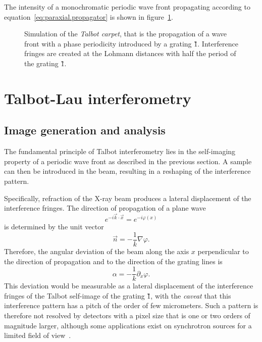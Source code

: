The intensity of a monochromatic periodic wave front propagating according to
equation~\eqref{eq:paraxial.propagator} is shown in
figure~\ref{fig:talbotcarpet}.

\begin{figure}[htb]
    \centering
    
    \caption[Talbot carpet.]{Simulation of the \emph{Talbot carpet},
    that is the propagation of a wave front with a phase periodicity
    introduced by a grating \G1.
    Interference fringes are created at the Lohmann distances with half the
period of the grating \G1.}
    \label{fig:talbotcarpet}
\end{figure}

\section{Talbot-Lau interferometry}
\subsection{Image generation and analysis}\label{sec:gi-image-analysis}
The fundamental principle of Talbot interferometry lies in the self-imaging
property of a periodic wave front as described in the previous section. A
sample can then be introduced in the beam, resulting in a reshaping of the
interference pattern.

Specifically, refraction of the X-ray beam produces a lateral displacement
of the interference fringes. The direction of propagation of a plane wave
\begin{equation}
    e^{-i \vec{k} \cdot \vec{x}} = e^{-i\varphi(x)}
    \label{eq:plane.wave}
\end{equation}
is determined by the unit vector
\begin{equation}
    \vec{n} = -\frac{1}{k} \nabla\varphi.
    \label{eq:plane.wave.direction}
\end{equation}
Therefore, the angular deviation of the beam along the axis $x$ perpendicular to
the direction of propagation and to the direction of the grating lines is
\begin{equation}
        \alpha = -\frac{1}{k} \partial_x\varphi.\label{eq:refraction.angle}
\end{equation}
This deviation would be measurable as a lateral displacement of the
interference fringes of the Talbot self-image of the grating \G1, with the
\emph{caveat} that this interference pattern has a pitch of the order of
few micrometers. Such a pattern is therefore not resolved by detectors with a pixel size
that is one or two orders of magnitude larger, although some applications
exist on synchrotron sources for a limited field of
view~\parencite{Cartier:yn5011}.

